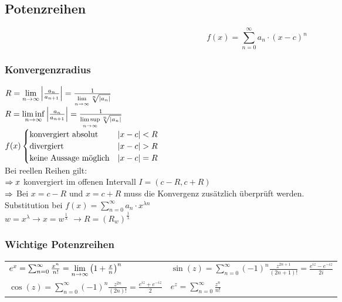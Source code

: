 \subsection{Potenzreihen} %
\begin{multicols}{2}
\begin{equation*}
f(x)=\sum_{n=0}^\infty a_n \cdot (x-c)^n
\end{equation*}
\subsubsection{Konvergenzradius}
$R = \lim\limits_{n\rightarrow \infty} \left\vert\frac{a_n}{a_{n+1}}\right\vert=\frac{1}{\lim\limits_{n\rightarrow \infty}\sqrt[n]{\left\vert a_n\right\vert}}$ \\
$R =\liminf\limits_{n\rightarrow \infty} \left\vert\frac{a_n}{a_{n+1}}\right\vert=\frac{1}{\limsup\limits_{n\rightarrow \infty}\sqrt[n]{\left\vert a_n\right\vert}}$ \\
$f(x)\begin{cases}
	\text{konvergiert absolut} & \left\vert x-c\right\vert < R \\
	\text{divergiert} & \left\vert x-c\right\vert > R \\
	\text{keine Aussage möglich} & \left\vert x-c\right\vert = R
	\end{cases}$\\
Bei reellen Reihen gilt: \\
$\Rightarrow x$ konvergiert im offenen Intervall $I=(c-R,c+R)$ \\
$\Rightarrow$ Bei $x=c-R$ und $x=c+R$ muss die Konvergenz zusätzlich überprüft werden.\\
Substitution bei $f(x)=\sum_{n=0}^\infty a_n \cdot x^{\lambda n}$ \\
$w=x^\lambda \rightarrow x=w^\frac{1}{\lambda}$
$\rightarrow R=\left(R_w\right)^\frac{1}{\lambda}$

\subsubsection{Wichtige Potenzreihen}
\label{sub:potenzreihen}

\begin{tabulary}{7cm}{L|L}
	
	$	e^x = \sum_{n = 0}^{\infty} \frac{x^n}{n!} = \lim\limits_{n\to\infty}\left(1+\frac{x}{n}\right)^n$ &
	$\sin (z) = \sum_{n = 0}^{\infty} (-1)^n \frac{z^{2n +1}}{(2n +1)!} = \frac{e^{iz} - e^{-iz}}{2i}$  \\
	 $ \cos (z) = \sum_{n = 0}^{\infty} (-1)^n \frac{z^{2n}}{(2n)!} = \frac{e^{iz} + e^{-iz}}{2}$&$	e^z = \sum_{n = 0}^{\infty} \frac{z^n}{n!}$ \\
\end{tabulary}

\end{multicols}
